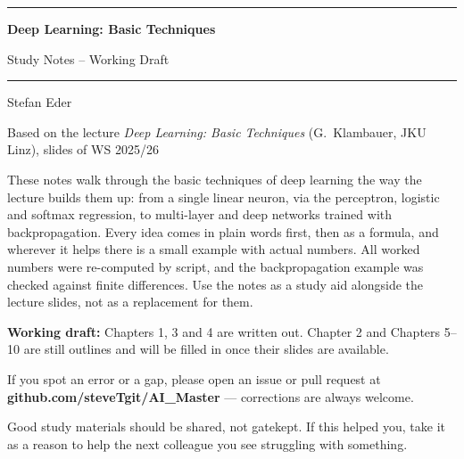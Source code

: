 \documentclass[11pt, oneside]{book}
\newcommand{\coursetitle}{Deep Learning: Basic Techniques}
\newcommand{\documenttype}{Study Notes -- Working Draft}
\newcommand{\authorname}{Stefan Eder}
\newcommand{\basedon}{Based on the lecture \emph{Deep Learning: Basic Techniques} (G.~Klambauer, JKU Linz), slides of WS 2025/26}
\begin{document}
\frontmatter  %


\thispagestyle{empty}
\vspace*{1.8cm}

\begin{center}
  {\color{accent}\rule{\linewidth}{1.8pt}}
  \vspace{0.65cm}

  {\fontsize{28}{34}\selectfont\bfseries\color{accent}\coursetitle\par}
  \vspace{0.25cm}
  {\large\color{gray!80!black}\documenttype\par}

  \vspace{0.55cm}
  {\color{accent!35}\rule{\linewidth}{0.5pt}}
  \vspace{0.55cm}

  {\large\authorname\par}
  \vspace{0.2cm}
  {\small\color{gray!70}\basedon\par}
\end{center}

\vspace{1.6cm}

\begin{center}
\begin{minipage}{0.84\textwidth}
  \small\color{gray!80!black}
  These notes walk through the basic techniques of deep learning the way the
  lecture builds them up: from a single linear neuron, via the perceptron,
  logistic and softmax regression, to multi-layer and deep networks trained
  with backpropagation. Every idea comes in plain words first, then as a
  formula, and wherever it helps there is a small example with actual numbers.
  All worked numbers were re-computed by script, and the backpropagation
  example was checked against finite differences.
  Use the notes as a study aid alongside the lecture slides, not as a
  replacement for them.

  \medskip
  \textbf{Working draft:} Chapters 1, 3 and 4 are written out. Chapter 2 and
  Chapters 5--10 are still outlines and will be filled in once their slides
  are available.

  \medskip
  If you spot an error or a gap, please open an issue or pull request at
  \textbf{github.com/steveTgit/AI\_Master} --- corrections are always welcome.

  \medskip
  \color{gray!60!black}
  Good study materials should be shared, not gatekept.
  If this helped you, take it as a reason to help the next colleague you see struggling with something.
\end{minipage}
\end{center}
\end{document}
